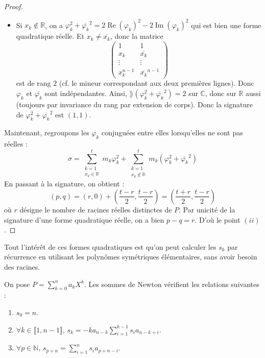 \begin{proof}
\begin{itemize}
      \item Si $x_k \notin \mathbb{R}$, on a $\varphi_k^2 + \overline{\varphi_k}^2 = 2 \operatorname{Re}(\varphi_k)^2 - 2 \operatorname{Im}(\varphi_k)^2$ qui est bien une forme quadratique réelle. Et $x_k \neq \overline{x_k}$, donc la matrice
      \[ \begin{pmatrix} 1 & 1 \\ x_k & \overline{x_k} \\ \vdots & \vdots \\ x_k^{n-1} & \overline{x_k}^{n-1} \end{pmatrix} \]
      est de rang $2$ (cf. le mineur correspondant aux deux premières lignes). Donc $\varphi_k$ et $\overline{\varphi_k}$ sont indépendantes. Ainsi, $\rang(\varphi_k^2 + \overline{\varphi_k}^2) = 2$ sur $\mathbb{C}$, donc sur $\mathbb{R}$ aussi (toujours par invariance du rang par extension de corps). Donc la signature de $\varphi_k^2 + \overline{\varphi_k}^2$ est $(1, 1)$.
    \end{itemize}
    Maintenant, regroupons les $\varphi_k$ conjuguées entre elles lorsqu'elles ne sont pas réelles :
    \[ \sigma = \sum_{\substack{k=1 \\ x_k \in \mathbb{R}}}^t m_k \varphi_k^2 + \sum_{\substack{k=1 \\ x_k \notin \mathbb{R}}}^t m_k (\varphi_k^2 + \overline{\varphi_k}^2) \]
    En passant à la signature, on obtient :
    \[ (p, q) = (r, 0) + \left( \frac{t-r}{2}, \frac{t-r}{2} \right) = \left( \frac{t+r}{2}, \frac{t-r}{2} \right) \]
    où $r$ désigne le nombre de racines réelles distinctes de $P$. Par unicité de la signature d'une forme quadratique réelle, on a bien $p-q=r$. D'où le point $(ii)$.
  \end{proof}

  \begin{remark}
    Tout l'intérêt de ces formes quadratiques est qu'on peut calculer les $s_k$ par récurrence en utilisant les polynômes symétriques élémentaires, sans avoir besoin des racines.
  \end{remark}


  \begin{proposition}
    On pose $P = \sum_{k=0}^n a_k X^k$. Les sommes de Newton vérifient les relations suivantes :
    \begin{enumerate}[label=(\roman*)]
      \item $s_0 = n$.
      \item $\forall k \in \llbracket 1, n-1 \rrbracket, \, s_k = -k a_{n-k} \sum_{i=1}^{k-1} s_i a_{n-k+i}$.
      \item $\forall p \in \mathbb{N}, \, s_{p+n} = \sum_{i=1}^{n} s_i a_{p+n-i}$.
    \end{enumerate}
  \end{proposition}

